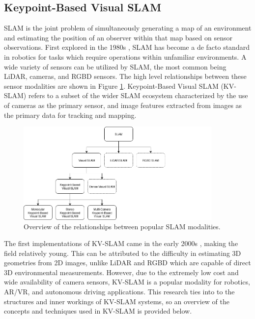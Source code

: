 \subsection{Keypoint-Based Visual SLAM}
\label{sec:kv_slam_background}

SLAM is the joint problem of simultaneously generating a map of an environment and estimating the position of an observer within that map based on sensor observations. First explored in the 1980s \cite{smithEstimatingUncertainSpatial1988}, SLAM has become a de facto standard in robotics for tasks which require operations within unfamiliar environments. A wide variety of sensors can be utilized by SLAM, the most common being LiDAR, cameras, and RGBD sensors. The high level relationships between these sensor modalities are shown in Figure \ref{fig:slam_family_tree}. Keypoint-Based Visual SLAM (KV-SLAM) refers to a subset of the wider SLAM ecosystem characterized by the use of cameras as the primary sensor, and image features extracted from images as the primary data for tracking and mapping.

\begin{figure}[!ht]
    \centering
    \includegraphics[width=0.9\textwidth]{resources/slam_family_tree.png}
    \caption[SLAM Family Tree]{Overview of the relationships between popular SLAM modalities.}
    \label{fig:slam_family_tree}
\end{figure}

The first implementations of KV-SLAM came in the early 2000s \cite{seMobileRobotLocalization2002}\cite{davisonRealtimeSimultaneousLocalisation2003}, making the field relatively young. This can be attributed to the difficulty in estimating 3D geometries from 2D images, unlike LiDAR and RGBD which are capable of direct 3D environmental measurements. However, due to the extremely low cost and wide availability of camera sensors, KV-SLAM is a popular modality for robotics, AR/VR, and autonomous driving applications. This research ties into to the structures and inner workings of KV-SLAM systems, so an overview of the concepts and techniques used in KV-SLAM is provided below.

